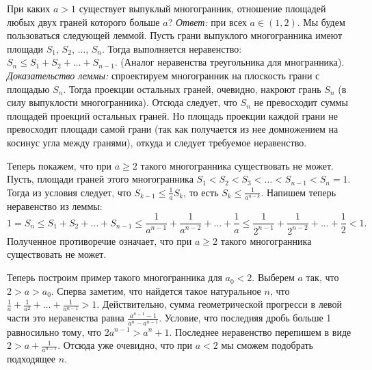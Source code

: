\problem
При каких $a > 1$ существует выпуклый многогранник, отношение площадей любых
двух граней которого больше $a$?
\solution
\emph{Ответ:} при всех $a \in (1, 2)$.
Мы будем пользоваться следующей леммой. 
Пусть грани выпуклого
многогранника имеют площади $S_1$, $S_2$, $\ldots$, $S_n$.
Тогда выполняется неравенство: $S_n \leq S_1 + S_2 + \ldots + S_{n-1}$.
(Аналог неравенства треугольника для многранника).
\\\emph{Доказательство леммы:}
спроектируем многогранник на плоскость грани с площадью $S_n$.
Тогда проекции остальных граней, очевидно, накроют грань $S_n$ (в силу выпуклости многогранника).
Отсюда следует, что $S_n$ не превосходит суммы площадей проекций остальных граней.
Но площадь проекции каждой грани не превосходит площади самой грани
(так как получается из нее домножением на косинус угла между гранями),
откуда и следует требуемое неравенство.

Теперь покажем, что при $a \geq 2$ такого многогранника существовать не может.
Пусть, площади граней этого многогранника
$S_1 < S_2 < S_3 < \ldots < S_{n-1} < S_n = 1$.
Тогда из условия следует, что $S_{k-1} \leq \frac{1}{a} S_k$, то есть $S_k \leq \frac{1}{a^{n-k}}$.
Напишем теперь неравенство из леммы:
\[
    1
=
    S_n \leq S_1 + S_2 + \ldots + S_{n-1}
\leq
    \frac{1}{a^{n-1}} + \frac{1}{a^{n-2}}
    + \ldots +
    \frac{1}{a}
\leq
    \frac{1}{2^{n-1}} + \frac{1}{2^{n-2}}
    + \ldots +
    \frac{1}{2}
<
    1
.\]
Полученное противоречие означает, что при $a \geq 2$ такого
многогранника существовать не может.

Теперь построим пример такого многогранника для $a_0<2$.
Выберем $a$ так, что $2>a>a_0$.
Сперва заметим, что найдется такое натуральное $n$,
что $\frac{1}{a}+\frac{1}{a^2}+\ldots+\frac{1}{a^{n-1}}>1$.
Действительно, сумма геометрической прогресси в левой
части это неравенства равна $\frac{a^{n-1}-1}{a^n-a^{n-1}}$.
Условие, что последняя дробь больше 1 равносильно тому,
что $2a^{n-1}>a^n+1$. Последнее неравенство перепишем
в виде $2>a+\frac{1}{a^{n-1}}$. Отсюда уже очевидно,
что при $a<2$ мы сможем подобрать подходящее $n$.

